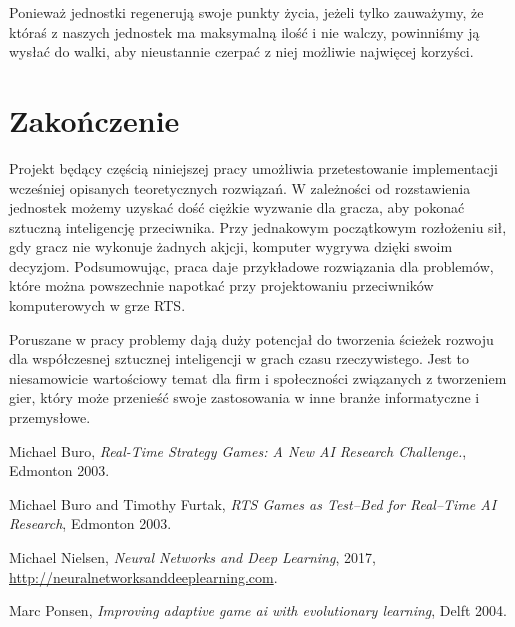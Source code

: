 \documentclass[12pt]{report}
\begin{document}
Ponieważ jednostki regenerują swoje punkty życia, jeżeli tylko zauważymy, że któraś z naszych jednostek ma maksymalną ilość i nie walczy, powinniśmy ją wysłać do walki, aby nieustannie czerpać z niej możliwie najwięcej korzyści.

\section{Zakończenie}
Projekt będący częścią niniejszej pracy umożliwia przetestowanie implementacji wcześniej opisanych teoretycznych rozwiązań. W zależności od rozstawienia jednostek możemy uzyskać dość ciężkie wyzwanie dla gracza, aby pokonać sztuczną inteligencję przeciwnika. Przy jednakowym początkowym rozłożeniu sił, gdy gracz nie wykonuje żadnych akjcji, komputer wygrywa dzięki swoim decyzjom. Podsumowując, praca daje przykładowe rozwiązania dla problemów, które można powszechnie napotkać przy projektowaniu przeciwników komputerowych w grze RTS.

Poruszane w pracy problemy dają duży potencjał do tworzenia ścieżek rozwoju dla współczesnej sztucznej inteligencji w grach czasu rzeczywistego. Jest to niesamowicie wartościowy temat dla firm i społeczności związanych z tworzeniem gier, który może przenieść swoje zastosowania w inne branże informatyczne i przemysłowe.




\cleardoublepage
{}
\begin{thebibliography}{9}

 Michael Buro, \emph{Real-Time Strategy Games: A New AI Research Challenge.}, Edmonton 2003.

 Michael Buro and Timothy Furtak, \emph{RTS Games as Test–Bed for Real–Time AI Research}, Edmonton 2003.

 Michael Nielsen, \emph{Neural Networks and Deep Learning}, 2017, \href{http://neuralnetworksanddeeplearning.com}{http://neuralnetworksanddeeplearning.com}.

 Marc Ponsen, \emph{Improving adaptive game ai with evolutionary learning}, Delft 2004.



\end{thebibliography}
\end{document}

